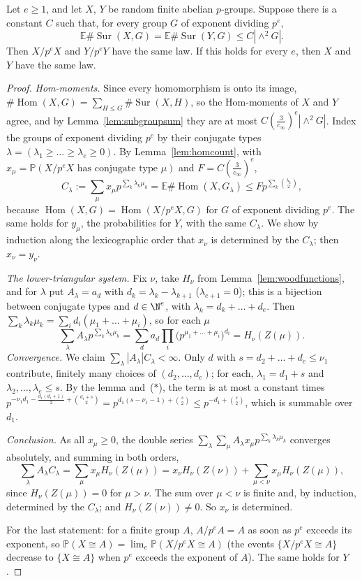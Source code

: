 \begin{theorem}[Wood, 2017]\label{thm:woodunique}
Let $e\ge1$, and let $X$, $Y$ be random finite abelian $p$-groups. Suppose there is a constant $C$ such that, for every group $G$ of exponent dividing $p^e$,
\[
\mathbb E\#\operatorname{Sur}(X,G)=\mathbb E\#\operatorname{Sur}(Y,G)\le C|\wedge^2G|.
\]
Then $X/p^eX$ and $Y/p^eY$ have the same law. If this holds for every $e$, then $X$ and $Y$ have the same law.
\end{theorem}
\begin{proof}
\emph{Hom-moments.} Since every homomorphism is onto its image, $\#\operatorname{Hom}(X,G)=\sum_{H\le G}\#\operatorname{Sur}(X,H)$, so the Hom-moments of $X$ and $Y$ agree, and by Lemma~\ref{lem:subgroupsum} they are at most $C(\frac3{c_\infty})^e|\wedge^2G|$. Index the groups of exponent dividing $p^e$ by their conjugate types $\lambda=(\lambda_1\ge\dots\ge\lambda_e\ge0)$. By Lemma~\ref{lem:homcount}, with $x_\mu=\mathbb P(X/p^eX\text{ has conjugate type }\mu)$ and $F=C(\frac3{c_\infty})^e$,
\[
C_\lambda:=\sum_\mu x_\mu p^{\sum_k\lambda_k\mu_k}=\mathbb E\#\operatorname{Hom}(X,G_\lambda)\le Fp^{\sum_k\binom{\lambda_k}2},\tag{$\ast$}
\]
because $\operatorname{Hom}(X,G)=\operatorname{Hom}(X/p^eX,G)$ for $G$ of exponent dividing $p^e$. The same holds for $y_\mu$, the probabilities for $Y$, with the same $C_\lambda$. We show by induction along the lexicographic order that $x_\nu$ is determined by the $C_\lambda$; then $x_\nu=y_\nu$.

\emph{The lower-triangular system.} Fix $\nu$, take $H_\nu$ from Lemma~\ref{lem:woodfunctions}, and for $\lambda$ put $A_\lambda=a_d$ with $d_k=\lambda_k-\lambda_{k+1}$ ($\lambda_{e+1}=0$); this is a bijection between conjugate types and $d\in\N^e$, with $\lambda_k=d_k+\dots+d_e$. Then $\sum_k\lambda_k\mu_k=\sum_id_i(\mu_1+\dots+\mu_i)$, so for each $\mu$
\[
\sum_\lambda A_\lambda p^{\sum_k\lambda_k\mu_k}=\sum_da_d\prod_i\bigl(p^{\mu_1+\dots+\mu_i}\bigr)^{d_i}=H_\nu(Z(\mu)).
\]
\emph{Convergence.} We claim $\sum_\lambda|A_\lambda|C_\lambda<\infty$. Only $d$ with $s=d_2+\dots+d_e\le\nu_1$ contribute, finitely many choices of $(d_2,\dots,d_e)$; for each, $\lambda_1=d_1+s$ and $\lambda_2,\dots,\lambda_e\le s$. By the lemma and~($\ast$), the term is at most a constant times $p^{-\nu_1d_1-\frac{d_1(d_1+1)}2+\binom{d_1+s}2}=p^{d_1(s-\nu_1-1)+\binom s2}\le p^{-d_1+\binom s2}$, which is summable over $d_1$.

\emph{Conclusion.} As all $x_\mu\ge0$, the double series $\sum_\lambda\sum_\mu A_\lambda x_\mu p^{\sum_k\lambda_k\mu_k}$ converges absolutely, and summing in both orders,
\[
\sum_\lambda A_\lambda C_\lambda=\sum_\mu x_\mu H_\nu(Z(\mu))=x_\nu H_\nu(Z(\nu))+\sum_{\mu<\nu}x_\mu H_\nu(Z(\mu)),
\]
since $H_\nu(Z(\mu))=0$ for $\mu>\nu$. The sum over $\mu<\nu$ is finite and, by induction, determined by the $C_\lambda$; and $H_\nu(Z(\nu))\ne0$. So $x_\nu$ is determined.

For the last statement: for a finite group $A$, $A/p^eA=A$ as soon as $p^e$ exceeds its exponent, so $\mathbb P(X\cong A)=\lim_e\mathbb P(X/p^eX\cong A)$ (the events $\{X/p^eX\cong A\}$ decrease to $\{X\cong A\}$ when $p^e$ exceeds the exponent of $A$). The same holds for $Y$.
\end{proof}

